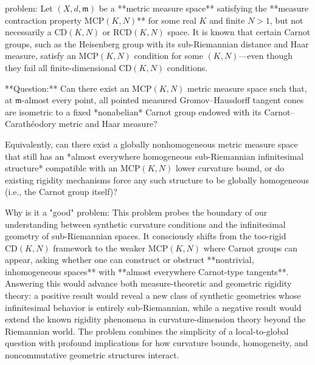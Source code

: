 problem:  
Let \( (X,d,\mathfrak{m}) \) be a **metric measure space** satisfying the **measure contraction property \( \mathrm{MCP}(K,N) \)** for some real \( K \) and finite \( N>1 \), but not necessarily a \( \mathrm{CD}(K,N) \) or \( \mathrm{RCD}(K,N) \) space. It is known that certain Carnot groups, such as the Heisenberg group with its sub-Riemannian distance and Haar measure, satisfy an \( \mathrm{MCP}(K,N) \) condition for some \( (K,N) \)—even though they fail all finite-dimensional \( \mathrm{CD}(K,N) \) conditions.  

**Question:**  
Can there exist an \( \mathrm{MCP}(K,N) \) metric measure space such that, at \( \mathfrak{m} \)-almost every point, all pointed measured Gromov–Hausdorff tangent cones are isometric to a fixed *nonabelian* Carnot group endowed with its Carnot–Carathéodory metric and Haar measure?  

Equivalently, can there exist a globally nonhomogeneous metric measure space that still has an *almost everywhere homogeneous sub-Riemannian infinitesimal structure* compatible with an \( \mathrm{MCP}(K,N) \) lower curvature bound, or do existing rigidity mechanisms force any such structure to be globally homogeneous (i.e., the Carnot group itself)?  

Why is it a "good" problem:  
This problem probes the boundary of our understanding between synthetic curvature conditions and the infinitesimal geometry of sub-Riemannian spaces. It consciously shifts from the too-rigid \( \mathrm{CD}(K,N) \) framework to the weaker \( \mathrm{MCP}(K,N) \) where Carnot groups can appear, asking whether one can construct or obstruct **nontrivial, inhomogeneous spaces** with **almost everywhere Carnot-type tangents**. Answering this would advance both measure-theoretic and geometric rigidity theory: a positive result would reveal a new class of synthetic geometries whose infinitesimal behavior is entirely sub-Riemannian, while a negative result would extend the known rigidity phenomena in curvature-dimension theory beyond the Riemannian world. The problem combines the simplicity of a local-to-global question with profound implications for how curvature bounds, homogeneity, and noncommutative geometric structures interact.